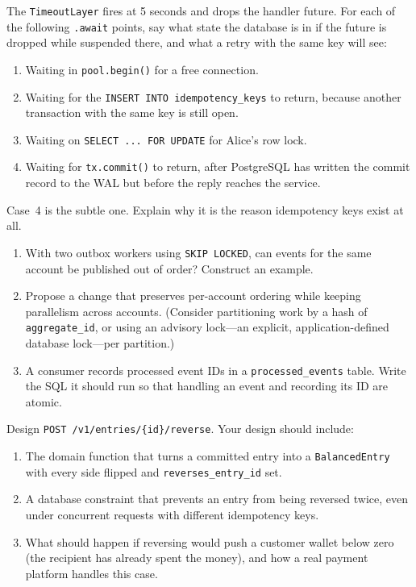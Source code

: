 \begin{exercise}
The \texttt{TimeoutLayer} fires at 5 seconds and drops the handler future. For each of the following \texttt{.await} points, say what state the database is in if the future is dropped while suspended there, and what a retry with the same key will see:
\begin{enumerate}
  \item Waiting in \texttt{pool.begin()} for a free connection.
  \item Waiting for the \texttt{INSERT INTO idempotency\_keys} to return, because another transaction with the same key is still open.
  \item Waiting on \texttt{SELECT ... FOR UPDATE} for Alice's row lock.
  \item Waiting for \texttt{tx.commit()} to return, after PostgreSQL has written the commit record to the WAL but before the reply reaches the service.
\end{enumerate}
Case~4 is the subtle one. Explain why it is the reason idempotency keys exist at all.
\end{exercise}

\begin{exercise}
\begin{enumerate}
  \item With two outbox workers using \texttt{SKIP LOCKED}, can events for the same account be published out of order? Construct an example.
  \item Propose a change that preserves per-account ordering while keeping parallelism across accounts. (Consider partitioning work by a hash of \texttt{aggregate\_id}, or using an advisory lock---an explicit, application-defined database lock---per partition.)
  \item A consumer records processed event IDs in a \texttt{processed\_events} table. Write the SQL it should run so that handling an event and recording its ID are atomic.
\end{enumerate}
\end{exercise}

\begin{exercise}
Design \texttt{POST /v1/entries/\{id\}/reverse}. Your design should include:
\begin{enumerate}
  \item The domain function that turns a committed entry into a \texttt{BalancedEntry} with every side flipped and \texttt{reverses\_entry\_id} set.
  \item A database constraint that prevents an entry from being reversed twice, even under concurrent requests with different idempotency keys.
  \item What should happen if reversing would push a customer wallet below zero (the recipient has already spent the money), and how a real payment platform handles this case.
\end{enumerate}
\end{exercise}
